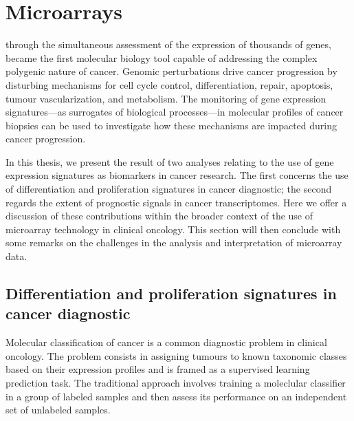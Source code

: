 \section{Microarrays}
\label{microarray-discussion}


 through the simultaneous assessment of the
expression of thousands of genes, became the first molecular biology tool
capable of addressing the complex polygenic nature of
cancer.\cite{grant_microarrays_2004} Genomic perturbations drive cancer
progression by disturbing mechanisms for cell cycle control, differentiation,
 repair, apoptosis, tumour vascularization, and metabolism.  The
monitoring of gene expression signatures---as surrogates of biological
processes---in molecular profiles of cancer biopsies can be used to investigate
how these mechanisms are impacted during cancer progression.


In this thesis, we present the result of two analyses relating to the use of
gene expression signatures as biomarkers in cancer research.  The first concerns
the use of differentiation and proliferation signatures in cancer diagnostic;
the second regards the extent of prognostic signals in cancer transcriptomes.
Here we offer a discussion of these contributions within the broader context of
the use of microarray technology in clinical oncology.  This section will then
conclude with some remarks on the challenges in the analysis and interpretation
of microarray data.

\subsection{Differentiation and proliferation signatures in cancer diagnostic}
\label{discussion-differentiation-microarrays}
Molecular classification of cancer is a common diagnostic problem in clinical
oncology.\cite{golub_molecular_1999,alizadeh_distinct_2000,bullinger_use_2004}
The problem consists in assigning tumours to known taxonomic classes based on
their expression profiles and is framed as a supervised learning prediction
task.  The traditional approach involves training a moleclular classifier in a
group of labeled samples and then assess its performance on an independent set
of unlabeled samples.\cite{golub_molecular_1999}

